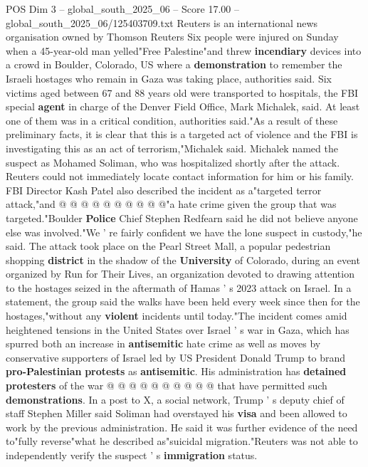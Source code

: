 \begin{textsample}{POS Dim 3 – global\_south\_2025\_06 – Score 17.00 – global\_south\_2025\_06/125403709.txt}  \label{ex:f3_pos_193}
Reuters is an international news organisation owned by Thomson Reuters Six people were injured on Sunday when a 45-year-old man yelled"Free Palestine"and threw \textbf{incendiary} devices into a crowd in Boulder, Colorado, US where a \textbf{demonstration} to remember the Israeli hostages who remain in Gaza was taking place, authorities said.
Six victims aged between 67 and 88 years old were transported to hospitals, the FBI special \textbf{agent} in charge of the Denver Field Office, Mark Michalek, said.
At least one of them was in a critical condition, authorities said."As a result of these preliminary facts, it is clear that this is a targeted act of violence and the FBI is investigating this as an act of terrorism,"Michalek said.
Michalek named the suspect as Mohamed Soliman, who was hospitalized shortly after the attack.
Reuters could not immediately locate contact information for him or his family.
FBI Director Kash Patel also described the incident as a"targeted terror attack,"and @ @ @ @ @ @ @ @ @ @"a hate crime given the group that was targeted."Boulder \textbf{Police} Chief Stephen Redfearn said he did not believe anyone else was involved."We ' re fairly confident we have the lone suspect in custody,"he said.
The attack took place on the Pearl Street Mall, a popular pedestrian shopping \textbf{district} in the shadow of the \textbf{University} of Colorado, during an event organized by Run for Their Lives, an organization devoted to drawing attention to the hostages seized in the aftermath of Hamas ' s 2023 attack on Israel.
In a statement, the group said the walks have been held every week since then for the hostages,"without any \textbf{violent} incidents until today."The incident comes amid heightened tensions in the United States over Israel ' s war in Gaza, which has spurred both an increase in \textbf{antisemitic} hate crime as well as moves by conservative supporters of Israel led by US President Donald Trump to brand \textbf{pro-Palestinian} \textbf{protests} as \textbf{antisemitic}.
His administration has \textbf{detained} \textbf{protesters} of the war @ @ @ @ @ @ @ @ @ @ that have permitted such \textbf{demonstrations}.
In a post to X, a social network, Trump ' s deputy chief of staff Stephen Miller said Soliman had overstayed his \textbf{visa} and been allowed to work by the previous administration.
He said it was further evidence of the need to"fully reverse"what he described as"suicidal migration."Reuters was not able to independently verify the suspect ' s \textbf{immigration} status.

\end{textsample}
